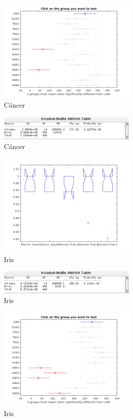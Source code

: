 \documentclass[a4paper,openwrite,12pt]{article}
\begin{document}
\begin{figure}[H]
\centering
\includegraphics[width=0.6\textwidth]{img/ranks_cancer.bmp.png}
\caption{Cáncer}
\end{figure}

\begin{figure}[H]
\centering
\includegraphics[width=0.6\textwidth]{img/anova_cancer.bmp.png}
\caption{Cáncer}
\end{figure}

\begin{figure}[H]
\centering
\includegraphics[width=0.6\textwidth]{img/box_iris.jpg}
\caption{Iris}
\end{figure}

\begin{figure}[H]
\centering
\includegraphics[width=0.6\textwidth]{img/anova_iris.bmp.png}
\caption{Iris}
\end{figure}

\begin{figure}[H]
\centering
\includegraphics[width=0.6\textwidth]{img/ranks_iris.bmp.png}
\caption{Iris}
\end{figure}
\end{document}
